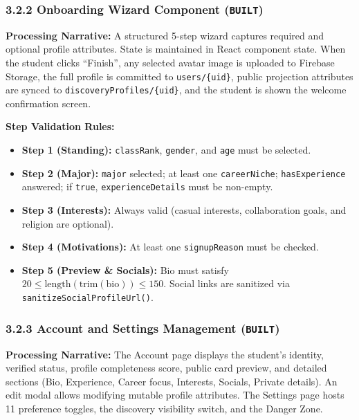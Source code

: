\documentclass[11pt,letterpaper]{article}
\begin{document}
\subsubsection*{3.2.2 Onboarding Wizard Component (\texttt{BUILT})}
\textbf{Processing Narrative:} A structured 5-step wizard captures required and optional profile attributes. State is maintained in React component state. When the student clicks ``Finish'', any selected avatar image is uploaded to Firebase Storage, the full profile is committed to \texttt{users/\{uid\}}, public projection attributes are synced to \texttt{discoveryProfiles/}\allowbreak\texttt{\{uid\}}, and the student is shown the welcome confirmation screen.

\textbf{Step Validation Rules:}
\begin{itemize}[leftmargin=*,noitemsep]
\item \textbf{Step 1 (Standing):} \texttt{classRank}, \texttt{gender}, and \texttt{age} must be selected.
\item \textbf{Step 2 (Major):} \texttt{major} selected; at least one \texttt{careerNiche}; \texttt{hasExperience} answered; if \texttt{true}, \texttt{experienceDetails} must be non-empty.
\item \textbf{Step 3 (Interests):} Always valid (casual interests, collaboration goals, and religion are optional).
\item \textbf{Step 4 (Motivations):} At least one \texttt{signupReason} must be checked.
\item \textbf{Step 5 (Preview \& Socials):} Bio must satisfy $20 \le \text{length}(\text{trim}(\text{bio})) \le 150$. Social links are sanitized via \texttt{sanitizeSocialProfileUrl()}.
\end{itemize}

\subsubsection*{3.2.3 Account and Settings Management (\texttt{BUILT})}
\textbf{Processing Narrative:} The Account page displays the student's identity, verified status, profile completeness score, public card preview, and detailed sections (Bio, Experience, Career focus, Interests, Socials, Private details). An edit modal allows modifying mutable profile attributes. The Settings page hosts 11 preference toggles, the discovery visibility switch, and the Danger Zone.
\end{document}
